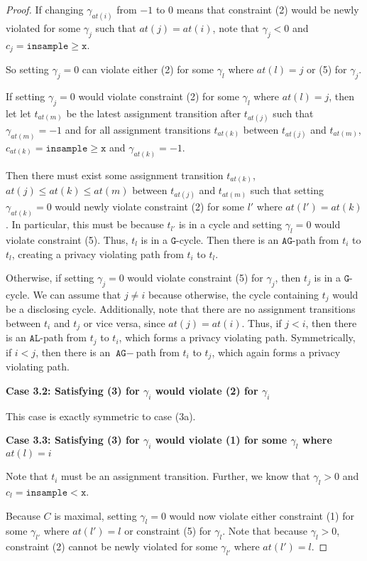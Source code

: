 \documentclass[12pt]{article}
\newcommand{\gguard}[1][x]{\texttt{insample}\geq #1}
\newcommand{\lguard}[1][x]{\texttt{insample} < #1}
\theoremstyle{definition}
\begin{document}
\begin{proof}
    If changing $\gamma_{at(i)}$ from $-1$ to $0$ means that constraint (2) would be newly violated for some $\gamma_j$ such that $at(j) = at(i)$, note that $\gamma_j < 0$ and $c_j = \gguard[\texttt{x}]$. 
    
    So setting $\gamma_j = 0$ can violate either (2) for some $\gamma_l$ where $at(l) = j$ or (5) for $\gamma_j$. 

    If setting $\gamma_j = 0$ would violate constraint (2) for some $\gamma_l$ where $at(l) = j$, then let let $t_{at(m)}$ be the latest assignment transition after $t_{at(j)}$ such that $\gamma_{at(m)} = -1$ and for all assignment transitions $t_{at(k)}$ between $t_{at(j)}$ and $t_{at(m)}$, $c_{at(k)} = \gguard[\texttt{x}]$ and $\gamma_{at(k)} = -1$. 
    
    Then there must exist some assignment transition $t_{at(k)}$, $at(j)\leq at(k)\leq at(m)$ between $t_{at(j)}$ and $t_{at(m)}$ such that setting $\gamma_{at(k)} = 0$ would newly violate constraint (2) for some $l'$ where $at(l') = at(k)$. 
    In particular, this must be because $t_{l'}$ is in a cycle and setting $\gamma_l = 0$ would violate constraint (5). Thus, $t_l$ is in a $\texttt{G}$-cycle. Then there is an $\texttt{AG}$-path from $t_i$ to $t_l$, creating a privacy violating path from $t_i$ to $t_l$. 

    Otherwise, if setting $\gamma_j = 0$ would violate constraint (5) for $\gamma_j$, then $t_j$ is in a $\texttt{G}$-cycle. We can assume that $j\neq i$ because otherwise, the cycle containing $t_j$ would be a disclosing cycle. Additionally, note that there are no assignment transitions between $t_i$ and $t_j$ or vice versa, since $at(j) = at(i)$.
    Thus, if $j<i$, then there is an $\texttt{AL}$-path from $t_j$ to $t_i$, which forms a privacy violating path. Symmetrically, if $i<j$, then there is an $\texttt{AG}-$path from $t_i$ to $t_j$, which again forms a privacy violating path. 

    \textbf{Case 3.2: Satisfying (3) for $\gamma_i$ would violate (2) for $\gamma_i$}

    This case is exactly symmetric to case (3a).

    \textbf{Case 3.3: Satisfying (3) for $\gamma_i$ would violate (1) for some $\gamma_l$ where $at(l) = i$}

    Note that $t_i$ must be an assignment transition. Further, we know that $\gamma_l>0$ and $c_l = \lguard[\texttt{x}]$. 
    
    Because $C$ is maximal, setting $\gamma_l=0$ would now violate either constraint (1) for some $\gamma_{l'}$ where $at(l') = l$ or constraint (5) for $\gamma_l$. Note that because $\gamma_l>0$, constraint (2) cannot be newly violated for some $\gamma_{l'}$ where $at(l') = l$.


\end{proof}
\end{document}
